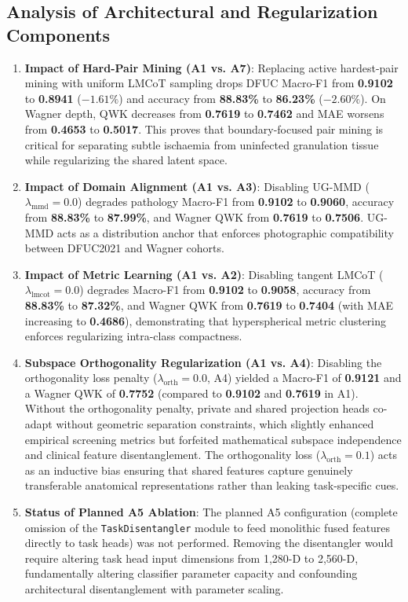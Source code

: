 \documentclass[journal]{IEEEtran}
\begin{document}
\subsection{Analysis of Architectural and Regularization Components}
\begin{enumerate}
    \item \textbf{Impact of Hard-Pair Mining (A1 vs. A7)}: Replacing active hardest-pair mining with uniform LMCoT sampling drops DFUC Macro-F1 from \textbf{0.9102} to \textbf{0.8941} ($-1.61\%$) and accuracy from \textbf{88.83\%} to \textbf{86.23\%} ($-2.60\%$). On Wagner depth, QWK decreases from \textbf{0.7619} to \textbf{0.7462} and MAE worsens from \textbf{0.4653} to \textbf{0.5017}. This proves that boundary-focused pair mining is critical for separating subtle ischaemia from uninfected granulation tissue while regularizing the shared latent space.
    \item \textbf{Impact of Domain Alignment (A1 vs. A3)}: Disabling UG-MMD ($\lambda_{\text{mmd}} = 0.0$) degrades pathology Macro-F1 from \textbf{0.9102} to \textbf{0.9060}, accuracy from \textbf{88.83\%} to \textbf{87.99\%}, and Wagner QWK from \textbf{0.7619} to \textbf{0.7506}. UG-MMD acts as a distribution anchor that enforces photographic compatibility between DFUC2021 and Wagner cohorts.
    \item \textbf{Impact of Metric Learning (A1 vs. A2)}: Disabling tangent LMCoT ($\lambda_{\text{lmcot}} = 0.0$) degrades Macro-F1 from \textbf{0.9102} to \textbf{0.9058}, accuracy from \textbf{88.83\%} to \textbf{87.32\%}, and Wagner QWK from \textbf{0.7619} to \textbf{0.7404} (with MAE increasing to \textbf{0.4686}), demonstrating that hyperspherical metric clustering enforces regularizing intra-class compactness.
    \item \textbf{Subspace Orthogonality Regularization (A1 vs. A4)}: Disabling the orthogonality loss penalty ($\lambda_{\text{orth}} = 0.0$, A4) yielded a Macro-F1 of \textbf{0.9121} and a Wagner QWK of \textbf{0.7752} (compared to \textbf{0.9102} and \textbf{0.7619} in A1). Without the orthogonality penalty, private and shared projection heads co-adapt without geometric separation constraints, which slightly enhanced empirical screening metrics but forfeited mathematical subspace independence and clinical feature disentanglement. The orthogonality loss ($\lambda_{\text{orth}} = 0.1$) acts as an inductive bias ensuring that shared features capture genuinely transferable anatomical representations rather than leaking task-specific cues.
    \item \textbf{Status of Planned A5 Ablation}: The planned A5 configuration (complete omission of the \texttt{TaskDisentangler} module to feed monolithic fused features directly to task heads) was not performed. Removing the disentangler would require altering task head input dimensions from 1,280-D to 2,560-D, fundamentally altering classifier parameter capacity and confounding architectural disentanglement with parameter scaling.
\end{enumerate}
\end{document}
